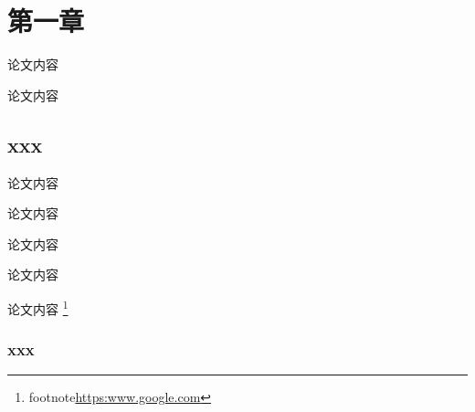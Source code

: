 \documentclass[a4paper,12pt]{ctexart}
\begin{document}
\makecoverpage

\section{第一章}

论文内容

论文内容

\subsection{xxx}
论文内容

论文内容

论文内容

论文内容

论文内容 \footnote{footnote\url{https:www.google.com}}



\subsubsection{xxx}
\end{document}
